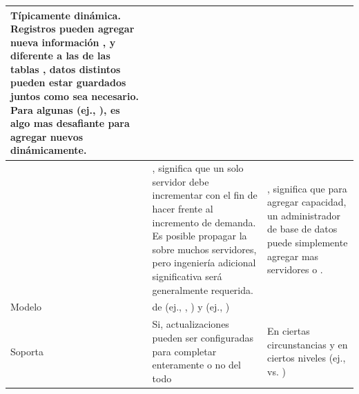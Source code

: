 \begin{table}[h!]
\begin{tabular}{ |L{0.1\paperwidth}|L{0.3\paperwidth}|L{0.3\paperwidth}|}
	Típicamente dinámica. Registros pueden agregar nueva información \onTheFly, y diferente a las \rowsDB de las tablas \sqlNAME, datos distintos pueden estar guardados juntos como sea necesario. Para algunas \dataBasesDB (ej., \wideColumnDB \stores), es algo mas desafiante para agregar nuevos \fields dinámicamente.

\\ \hline
	\scaling&%
	
	\verticallyScale, significa que un solo servidor debe incrementar \powerful con el fin de hacer frente al incremento de demanda. Es posible propagar la \dataBaseDB \sqlNAME sobre muchos servidores, pero ingeniería adicional significativa será generalmente requerida.&
	
	\horizontallyScale, significa que para agregar capacidad, un administrador de base de datos puede simplemente agregar mas servidores o \cloudInstances.
	
\\ \hline
	Modelo \developmentPC &
	
	\mix de \openSourcePC (ej., \postgresql, \mysqlNAME) y \closedSource (ej., \oracle \dataBaseDB)&
	\openSourcePC
	
\\ \hline
	Soporta \transactionsDB&
	
	Si, actualizaciones pueden ser configuradas para completar enteramente o no del todo&	
	
	En ciertas circunstancias y en ciertos niveles (ej., \documentLevel vs. \dataBaseLevel)
	

\end{tabular}
\end{table}
